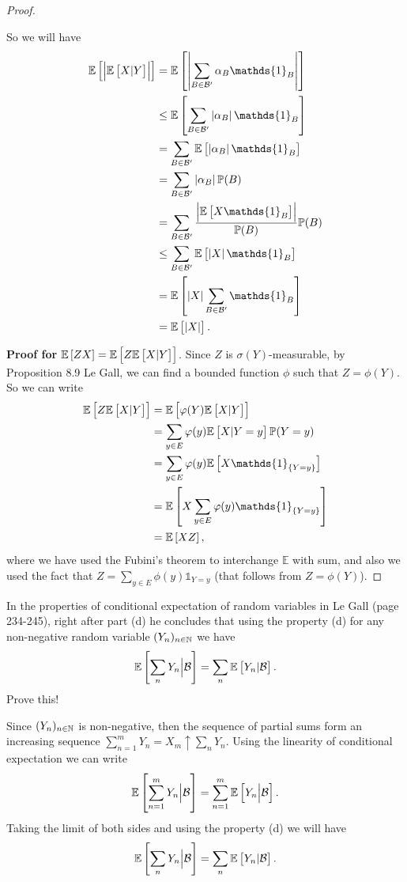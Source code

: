 \begin{proof}
\begin{itemize}
		So we will have
		\begin{align*}
			\E{\abs{\E{X|Y}}} &= \E{\abs{\sum_{B\in\mathcal{B}'} \alpha_B \mathds{1}_B }} \\
			&\leq \E{\sum_{B\in\mathcal{B}'}\abs{\alpha_B} \mathds{1}_B} \\
			&=\sum_{B\in\mathcal{B}'} \E{\abs{\alpha_B}\mathds{1}_B} \\
			&=\sum_{B\in\mathcal{B}'} \abs{\alpha_B} \prob(B) \\
			&=\sum_{B\in\mathcal{B}'} \frac{\abs{\E{X\mathds{1}_B}}}{\prob(B)}\prob(B) \\
			&\leq \sum_{B\in\mathcal{B}'} \E{\abs{X}\mathds{1}_B} \\
			&=\E{\abs{X}\sum_{B\in\mathcal{B}'}\mathds{1}_B} \\
			&=\E{\abs{X}}.
		\end{align*}
	\end{itemize}
	
	\noindent \textbf{Proof for $ \mathbb{E}\left[ZX\right] = \mathbb{E}\left[Z\mathbb{E}\left[X|Y\right]\right] $}. Since $ Z $ is $ \sigma(Y) $-measurable, by Proposition 8.9 Le Gall, we can find a bounded function $ \phi $ such that $ Z = \phi(Y) $. So we can write
	\begin{align*}
		\E{Z\E{X|Y}} &= \E{\phi(Y)\E{X|Y}} \\
		&= \sum_{y\in E} \phi(y) \E{X|Y=y}\prob(Y=y) \\
		&= \sum_{y\in E} \phi(y) \E{X\mathds{1}_{\set{Y=y}}}\\
		&= \E{X \sum_{y\in E} \phi(y) \mathds{1}_{\set{Y=y}} } \\
		&=\E{XZ},
	\end{align*}
	where we have used the Fubini's theorem to interchange $ \mathbb{E}  $ with sum, and also we used the fact that $ Z = \sum_{y\in E} \phi(y)\mathds{1}_{Y=y} $ (that follows from $ Z=\phi(Y) $).

\end{proof}


\begin{problem}
	In the properties of conditional expectation of random variables in Le Gall (page 234-245), right after part (d) he concludes that using the property (d) for any non-negative random variable $ (Y_n)_{n\in \mathbb{N}} $ we have
	\[ \mathbb{E}\left[\sum_n Y_n \big| \mathcal{B}\right] = \sum_n \mathbb{E}\left[Y_n|\mathcal{B}\right]. \]
	Prove this!
\end{problem}
\begin{solution}
	Since $ (Y_n)_{n\in \mathbb{N}} $ is non-negative, then the sequence of partial sums form an increasing sequence $\sum_{n=1}^{m}Y_n  = X_m\uparrow \sum_n Y_n $. Using the linearity of conditional expectation we can write
	\[ \mathbb{E}\left[\sum_{n=1}^{m} Y_n \big| \mathcal{B}\right] = \sum_{n=1}^{m} \mathbb{E}\left[Y_n \big| \mathcal{B}\right]. \]
	Taking the limit of both sides and using the property (d) we will have
	\[ \mathbb{E}\left[\sum_n Y_n \big| \mathcal{B}\right] = \sum_n \mathbb{E}\left[Y_n | \mathcal{B}\right]. \]
\end{solution}

